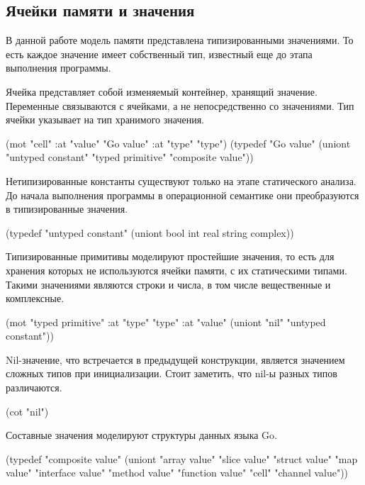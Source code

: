 \documentclass[12pt,twoside,russian]{article}
\begin{document}
\subsection{Ячейки памяти и значения}
В данной работе модель памяти представлена типизированными значениями. То есть каждое значение имеет собственный тип, известный еще до этапа выполнения программы. 

Ячейка представляет собой изменяемый контейнер, хранящий значение. Переменные связываются с ячейками, а не непосредственно со значениями. Тип ячейки указывает на тип хранимого значения.

\begin{ABMLCode}
(mot "cell" :at "value" "Go value" :at "type" "type")
(typedef "Go value" (uniont "untyped constant" "typed primitive" 
                            "composite value"))
\end{ABMLCode}

Нетипизированные константы существуют только на этапе статического анализа. До начала выполнения программы в операционной семантике они преобразуются в типизированные значения.

\begin{ABMLCode}
(typedef "untyped constant" (uniont bool int real string complex))
\end{ABMLCode}

Типизированные примитивы моделируют простейшие значения, то есть для хранения которых не используются ячейки памяти, с их статическими типами. Такими значениями являются строки и числа, в том числе вещественные и комплексные.

\begin{ABMLCode}
(mot "typed primitive" 
	:at "type" "type"
	:at "value" (uniont "nil" "untyped constant"))
\end{ABMLCode}

Nil-значение, что встречается в предыдущей конструкции, является значением сложных типов при инициализации. Стоит заметить, что nil-ы разных типов различаются.

\begin{ABMLCode}
(cot "nil")
\end{ABMLCode}

Составные значения моделируют структуры данных языка Go.

\begin{ABMLCode}
(typedef "composite value" 
    (uniont "array value" "slice value" "struct value" 
            "map value" "interface value" "method value"
            "function value" "cell" "channel value"))
\end{ABMLCode}
\end{document}
